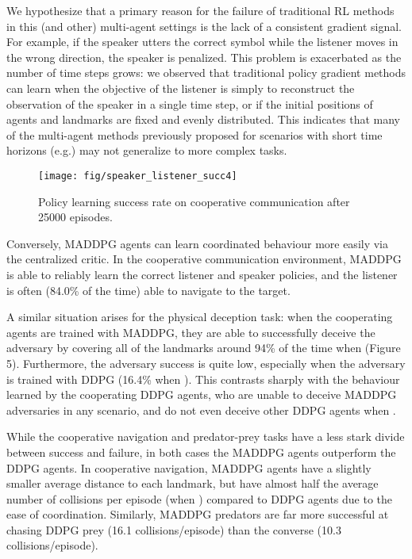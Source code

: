 \documentclass{article}
\begin{document}
We hypothesize that a primary reason for the failure of traditional RL methods in this (and other) multi-agent settings is the lack of a consistent gradient signal. For example, if the speaker utters the correct symbol while the listener moves in the wrong direction, the speaker is penalized. This problem is exacerbated as the number of time steps grows: we observed that traditional policy gradient methods can learn when the objective of the listener is simply to reconstruct the observation of the speaker in a single time step, or if the initial positions of agents and landmarks are fixed and evenly distributed. This indicates that many of the multi-agent methods previously proposed for scenarios with short time horizons (e.g.\@ \cite{lazaridou2016multi}) may not generalize to more complex tasks.



\begin{wrapfigure}{l}{0.5\textwidth}
\centering
\texttt{[image: fig/speaker\_listener\_succ4]}
\caption{\label{fig:comm_succ} Policy learning success rate on cooperative communication after 25000 episodes. \vspace{-4mm}}
\end{wrapfigure}
Conversely, MADDPG agents can learn coordinated behaviour more easily via the centralized critic. In the cooperative communication environment, MADDPG is able to reliably learn the correct listener and speaker policies, and the listener is often (84.0\% of the time) able to navigate to the target.

A similar situation arises for the physical deception task: when the cooperating agents are trained with MADDPG, they are able to successfully deceive the adversary by covering all of the landmarks around 94\% of the time when  (Figure 5). Furthermore, the adversary success is quite low, especially when the adversary is trained with DDPG (16.4\% when ). This contrasts sharply with the behaviour learned by the cooperating DDPG agents, who are unable to deceive MADDPG adversaries in any scenario, and do not even deceive other DDPG agents when .

While the cooperative navigation and predator-prey tasks have a less stark divide between success and failure, in both cases the MADDPG agents outperform the DDPG agents. In cooperative navigation, MADDPG agents have a slightly smaller average distance to each landmark, but have almost half the average number of collisions per episode (when ) compared to DDPG agents due to the ease of coordination. Similarly, MADDPG predators are far more successful at chasing DDPG prey (16.1 collisions/episode) than the converse (10.3 collisions/episode).
\end{document}
